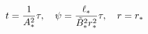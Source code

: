 \begin{equation}
t={1\over A^{2}_{*}}\tau,\quad 
\psi={\ell_{*}\over \tilde{B}_{*}^{2}r_{*}^{2}}\tau,
\quad r=r_{*}
\end{equation}


